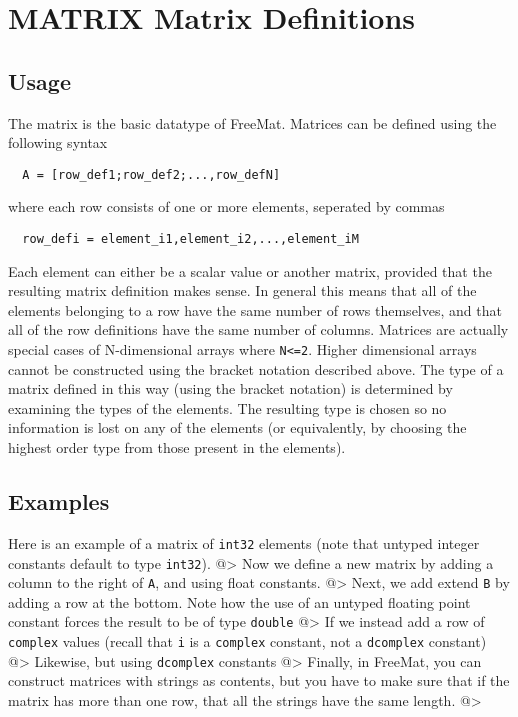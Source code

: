\section{MATRIX Matrix Definitions}

\subsection{Usage}

The matrix is the basic datatype of FreeMat.  Matrices can be
defined using the following syntax
\begin{verbatim}
  A = [row_def1;row_def2;...,row_defN]
\end{verbatim}
where each row consists of one or more elements, seperated by
commas
\begin{verbatim}
  row_defi = element_i1,element_i2,...,element_iM
\end{verbatim}
Each element can either be a scalar value or another matrix,
provided that the resulting matrix definition makes sense.
In general this means that all of the elements belonging
to a row have the same number of rows themselves, and that
all of the row definitions have the same number of columns.
Matrices are actually special cases of N-dimensional arrays
where \verb|N<=2|.  Higher dimensional arrays cannot be constructed
using the bracket notation described above.  The type of a
matrix defined in this way (using the bracket notation) is
determined by examining the types of the elements.  The resulting
type is chosen so no information is lost on any of the elements
(or equivalently, by choosing the highest order type from those
present in the elements).
\subsection{Examples}

Here is an example of a matrix of \verb|int32| elements (note that
untyped integer constants default to type \verb|int32|).
@>
Now we define a new matrix by adding a column to the right of
\verb|A|, and using float constants.
@>
Next, we add extend \verb|B| by adding a row at the bottom.  Note
how the use of an untyped floating point constant forces the
result to be of type \verb|double|
@>
If we instead add a row of \verb|complex| values (recall that \verb|i| is
a \verb|complex| constant, not a \verb|dcomplex| constant)
@>
Likewise, but using \verb|dcomplex| constants
@>
Finally, in FreeMat, you can construct matrices with strings
as contents, but you have to make sure that if the matrix has
more than one row, that all the strings have the same length.
@>
